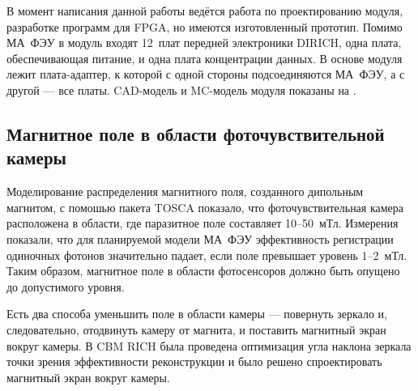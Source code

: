 В момент написания данной работы ведётся работа по проектированию модуля, разработке программ для FPGA, но имеются изготовленный прототип. Помимо МА~ФЭУ в модуль входят 12~плат передней электроники DIRICH, одна плата, обеспечивающая питание, и одна плата концентрации данных. В основе модуля лежит плата-адаптер, к которой с одной стороны подсоединяются МА~ФЭУ, а с другой --- все платы. CAD-модель и MC-модель модуля показаны на .



\subsection{Магнитное поле в области фоточувствительной камеры}


Моделирование распределения магнитного поля, созданного дипольным магнитом, с помошью пакета TOSCA показало, что фоточувствительная камера расположена в области, где паразитное поле составляет 10--50~мТл. Измерения показали, что для планируемой модели МА~ФЭУ эффективность регистрации одиночных фотонов значительно падает, если поле превышает уровень 1--2~мТл. Таким образом, магнитное поле в области фотосенсоров должно быть опущено до допустимого уровня.


Есть два способа уменьшить поле в области камеры --- повернуть зеркало и, следовательно, отодвинуть камеру от магнита, и поставить магнитный экран вокруг камеры. В CBM RICH была проведена оптимизация угла наклона зеркала точки зрения эффективности реконструкции и было решено спроектировать магнитный экран вокруг камеры.

